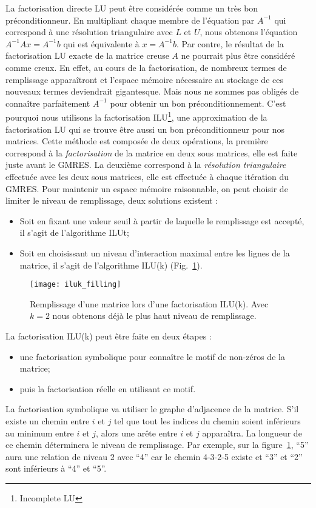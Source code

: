 La factorisation directe LU peut être considérée comme un très bon préconditionneur.
%
En multipliant chaque membre de l'équation par $A^{-1}$ qui correspond à une résolution triangulaire avec $L$ et $U$, nous obtenons l'équation $A^{-1}Ax=A^{-1}b$ qui est équivalente à $x=A^{-1}b$.
%
Par contre, le résultat de la factorisation LU exacte de la matrice creuse $A$ ne pourrait plus être considéré comme creux.
%
En effet, au cours de la factorisation, de nombreux termes de remplissage apparaîtront et l'espace mémoire nécessaire au stockage de ces nouveaux termes deviendrait gigantesque.
%
Mais nous ne sommes pas obligés de connaître parfaitement $A^{-1}$ pour obtenir un bon préconditionnement.
%
C'est pourquoi nous utilisons la factorisation ILU\footnote{Incomplete LU}, une approximation de la factorisation LU qui se trouve être aussi un bon préconditionneur pour nos matrices.
%
Cette méthode est composée de deux opérations, la première correspond à la {\em factorisation} de la matrice en deux sous matrices, elle est faite juste avant le GMRES.
%
La deuxième correspond à la {\em résolution triangulaire} effectuée avec les deux sous matrices, elle est effectuée à chaque itération du GMRES.
%
Pour maintenir un espace mémoire raisonnable, on peut choisir de limiter le niveau de remplissage, deux solutions existent :
\begin{itemize}
  \item Soit en fixant une valeur seuil à partir de laquelle le remplissage est accepté, il s'agit de l'algorithme ILUt;
  \item Soit en choisissant un niveau d'interaction maximal entre les lignes de la matrice, il s'agit de l'algorithme ILU(k) (Fig.~\ref{fig:iluk_filling}).
\end{itemize}

\begin{figure}[!h]
  \centering
  \texttt{[image: iluk\_filling]}
  \caption{Remplissage d'une matrice lors d'une factorisation ILU(k). Avec $k=2$ nous obtenons déjà le plus haut niveau de remplissage.}
  \label{fig:iluk_filling}
\end{figure}

La factorisation ILU(k) peut être faite en deux étapes :
\begin{itemize}
  \item une factorisation symbolique pour connaître le motif de non-zéros de la matrice;
  \item puis la factorisation réelle en utilisant ce motif.
\end{itemize}
%
La factorisation symbolique va utiliser le graphe d'adjacence de la matrice.
%
S'il existe un chemin entre $i$ et $j$ tel que tout les indices du chemin soient inférieurs au minimum entre $i$ et $j$, alors une arête entre $i$ et $j$ apparaîtra.
%
La longueur de ce chemin déterminera le niveau de remplissage.
%
Par exemple, sur la figure~\ref{fig:iluk_filling}, ``5'' aura une relation de niveau 2 avec ``4'' car le chemin 4-3-2-5 existe et ``3'' et ``2'' sont inférieurs à ``4'' et ``5''.

